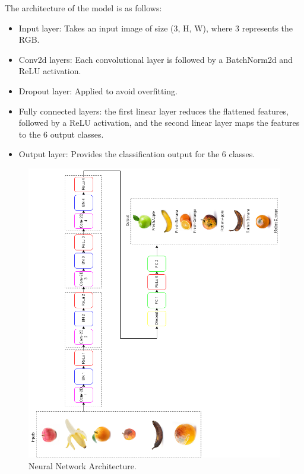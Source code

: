 \documentclass[conference]{IEEEtran}
\begin{document}
The architecture of the model is as follows:
\begin{itemize}
    \item Input layer: Takes an input image of size (3, H, W), where 3 represents the RGB.
    \item Conv2d layers: Each convolutional layer is followed by a BatchNorm2d and ReLU activation.
    \item Dropout layer: Applied to avoid overfitting.
    \item Fully connected layers: the first linear layer reduces the flattened features, followed by a ReLU activation, and the second linear layer maps the features to the 6 output classes.
    \item Output layer: Provides the classification output for the 6 classes.
\end{itemize}

\begin{figure}[h]
    \centering
    \includegraphics[width=\linewidth]{Ai Prent.drawio (1).png}
    \caption{Neural Network Architecture.}
    \label{fig}
\end{figure}
\end{document}
